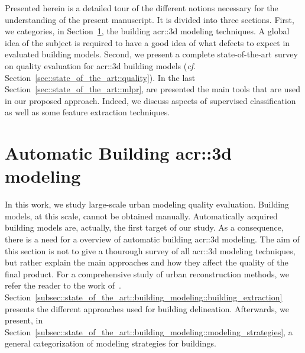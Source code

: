 \minitoc

\vfill

Presented herein is a detailed tour of the different notions necessary for the understanding of the present manuscript.
It is divided into three sections.
First, we categories, in Section~\ref{sec::state_of_the_art::building_modeling}, the building \gls{acr::3d} modeling techniques.
A global idea of the subject is required to have a good idea of what defects to expect in evaluated building models.
Second, we present a complete state-of-the-art survey on quality evaluation for \gls{acr::3d} building models (\textit{cf.} Section~\ref{sec::state_of_the_art::quality}).
In the last Section~\ref{sec::state_of_the_art::mlpr}, are presented the main tools that are used in our proposed approach.
Indeed, we discuss aspects of supervised classification as well as some feature extraction techniques.

\clearpage

\section{Automatic Building \texorpdfstring{\gls*{acr::3d}}{3D} modeling}
    \label{sec::state_of_the_art::building_modeling}
    In this work, we study large-scale urban modeling quality evaluation.
    Building models, at this scale, cannot be obtained manually.
    Automatically acquired building models are, actually, the first target of our study.
    As a consequence, there is a need for a overview of automatic building \gls{acr::3d} modeling.
    The aim of this section is not to give a thourough survey of all \gls{acr::3d} modeling techniques, but rather explain the main approaches and how they affect the quality of the final product.
    For a comprehensive study of urban reconstruction methods, we refer the reader to the work of~\textcite{musialski2013survey}.\\
    Section~\ref{subsec::state_of_the_art::building_modeling::building_extraction} presents the different approaches used for building delineation.
    Afterwards, we present, in Section~\ref{subsec::state_of_the_art::building_modeling::modeling_strategies}, a general categorization of modeling strategies for buildings.

